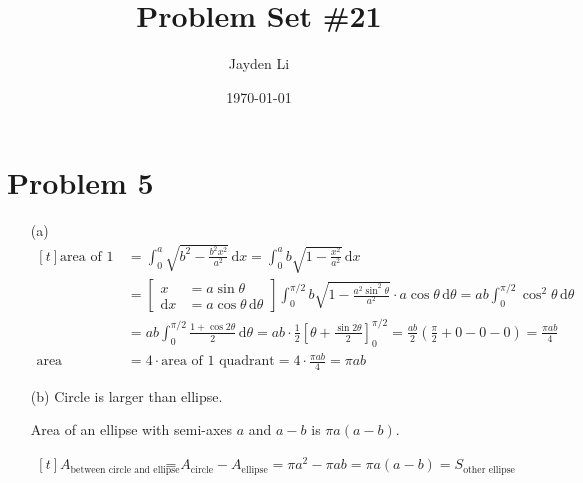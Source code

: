 \documentclass[preview, margin=0.6in]{standalone}
\title{\vspace*{-30pt}Problem Set \#21}
\author{Jayden Li}
\date{\today}
\newcommand*{\problem}[1]{\section*{Problem #1}}
\begin{document}
\fontsize{12pt}{12pt}\selectfont
\setlength{\abovedisplayskip}{0pt}
\maketitle
\problem{5}
\begin{itemize}
	\item[(a)]
		$\begin{aligned}[t]
			\text{area of 1 quadrant}
			&=\int_{0}^{a}\sqrt{b^2-\frac{b^2x^2}{a^2}}\,\mathrm{d}x
			=\int_{0}^{a}b\sqrt{1-\frac{x^2}{a^2}}\,\mathrm{d}x \\
			&=\left[\begin{aligned}
					x&=a\sin\theta \\
					\mathrm{d}x&=a\cos\theta \,\mathrm{d}\theta
			\end{aligned}\right]
			\int_{0}^{\pi/2}b \sqrt{1-\frac{a^2\sin^2\theta}{a^2}}\cdot a\cos\theta\,\mathrm{d}\theta
			=ab \int_{0}^{\pi/2}\cos^2\theta\,\mathrm{d}\theta \\
			&=ab \int_{0}^{\pi/2}\frac{1+\cos2\theta}{2}\,\mathrm{d}\theta
			=ab \cdot \frac12 \left[\theta+\frac{\sin2\theta}{2}\right]_{0}^{\pi/2}
			=\frac{ab}{2}\left(\frac{\pi}{2}+0-0-0\right)
			=\frac{\pi ab}{4} \\
			\text{area}
			&=4\cdot\text{area of 1 quadrant}
			=4\cdot \frac{\pi ab}{4}
			=\boxed{\pi ab}
		\end{aligned}$

	\item[(b)]
		Circle is larger than ellipse.

		Area of an ellipse with semi-axes $a$ and $a-b$ is $\pi a(a-b)$.

		$\begin{aligned}[t]
			A_{\text{between circle and ellipse}}
			&=A_{\text{circle}}-A_{\text{ellipse}}
			=\pi a^2-\pi ab
			=\pi a(a-b)
			=S_{\text{other ellipse}}
		\end{aligned}$
\end{itemize}
\end{document}
